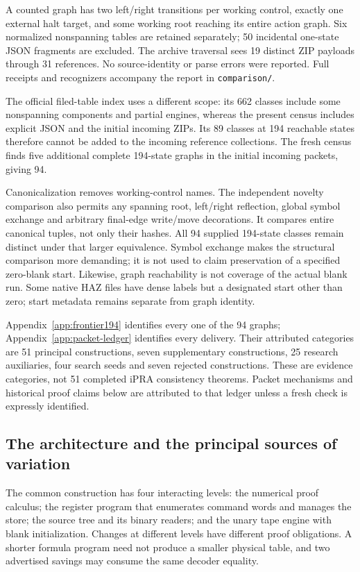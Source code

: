 A counted graph has two left/right transitions per working control,
exactly one external halt target, and some working root reaching its
entire action graph. Six normalized nonspanning tables are retained
separately; 50 incidental one-state JSON fragments are excluded. The
archive traversal sees 19 distinct ZIP payloads through 31 references.
No source-identity or parse errors were reported. Full receipts and
recognizers accompany the report in \nolinkurl{comparison/}.

The official filed-table index uses a different scope: its 662 classes
include some nonspanning components and partial engines, whereas the
present census includes explicit JSON and the initial incoming ZIPs. Its 89
classes at 194 reachable states therefore cannot be added to the
incoming reference collections. The fresh census finds five additional
complete 194-state graphs in the initial incoming packets, giving 94.
\cite{machines}

Canonicalization removes working-control names. The independent novelty
comparison also permits any spanning root, left/right reflection,
global symbol exchange and arbitrary final-edge write/move decorations.
It compares entire canonical tuples, not only their hashes. All 94
supplied 194-state classes remain distinct under that larger equivalence.
Symbol exchange makes the structural comparison more demanding; it is
not used to claim preservation of a specified zero-blank start.
Likewise, graph reachability is not coverage of the actual blank run.
Some native HAZ files have dense labels but a designated start other
than zero; start metadata remains separate from graph identity.

Appendix~\ref{app:frontier194} identifies every one of the 94 graphs;
Appendix~\ref{app:packet-ledger} identifies every delivery. Their attributed
categories are 51 principal constructions, seven supplementary
constructions, 25 research auxiliaries, four search seeds and seven
rejected constructions. These are evidence categories, not 51 completed
iPRA consistency theorems. Packet mechanisms and historical proof
claims below are attributed to that ledger unless a fresh check is
expressly identified.

\subsection{The architecture and the principal sources of variation}

The common construction has four interacting levels: the numerical
proof calculus; the register program that enumerates command words and
manages the store; the source tree and its binary readers; and the unary
tape engine with blank initialization. Changes at different levels have
different proof obligations. A shorter formula program need not produce
a smaller physical table, and two advertised savings may consume the
same decoder equality.

